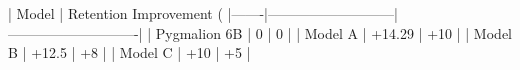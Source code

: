 | Model | Retention Improvement (%
|-------|---------------------------|----------------------------|
| Pygmalion 6B | 0                         | 0                          |
| Model A     | +14.29                    | +10                        |
| Model B     | +12.5                     | +8                         |
| Model C     | +10                       | +5                         |